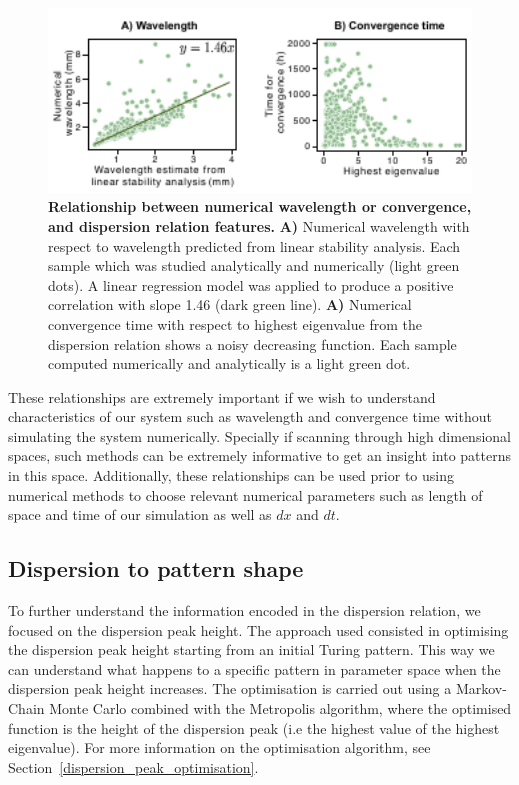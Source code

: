\begin{figure}[H] %
    \centering
    \includegraphics[width=1\textwidth]{chapters/Chapter 1/dispersion_to_wavelength_convergence} %
    \caption{\textbf{Relationship between numerical wavelength or convergence, and dispersion relation features.} \textbf{A)} Numerical wavelength with respect to wavelength predicted from linear stability analysis. Each sample which was studied analytically and numerically (light green dots). A linear regression model was applied to produce a positive correlation with slope 1.46 (dark green line). \textbf{A)} Numerical convergence time with respect to highest eigenvalue from the dispersion relation shows a noisy decreasing function. Each sample computed numerically and analytically is a light green dot.}
    \label{fig:dispersion_to_wavelength_convergence} %
\end{figure}

These relationships are extremely important if we wish to understand characteristics of our system such as wavelength and convergence time without simulating the system numerically.
Specially if scanning through high dimensional spaces, such methods can be extremely informative to get an insight into patterns in this space.
Additionally, these relationships can be used prior to using numerical methods to choose relevant numerical parameters such as length of space and time of our simulation as well as $dx$ and $dt$.

\subsection{Dispersion to pattern shape}
To further understand the information encoded in the dispersion relation, we focused on the dispersion peak height.
The approach used consisted in optimising the dispersion peak height starting from an initial Turing pattern.
This way we can understand what happens to a specific pattern in parameter space when the dispersion peak height increases.
The optimisation is carried out using a Markov-Chain Monte Carlo combined with the Metropolis algorithm, where the optimised function is the height of the dispersion peak (i.e the highest value of the highest eigenvalue).
For more information on the optimisation algorithm, see Section~\ref{dispersion_peak_optimisation}.

